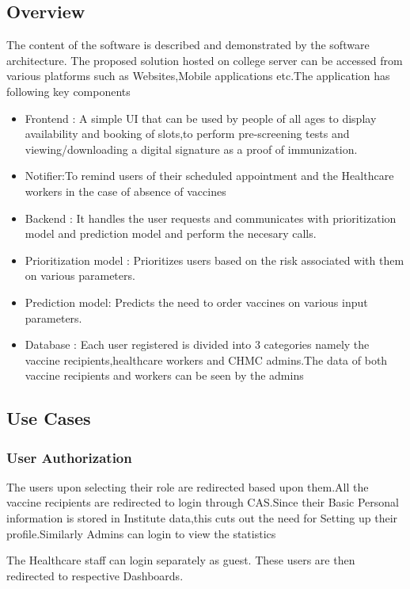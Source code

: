 \documentclass[10pt,twocolumn,letterpaper]{article}
\begin{document}
\subsection{Overview}
The content of the software is described and demonstrated by the software architecture.
The proposed solution hosted on college server can be accessed from various platforms such as Websites,Mobile applications etc.The application has following key components
\begin{itemize}
    \item Frontend : A simple UI that can be used by people of all ages to display availability and booking of slots,to perform pre-screening tests and viewing/downloading a digital signature as a proof of immunization.
    \item Notifier:To remind users of their scheduled appointment and the Healthcare workers in the case of absence of vaccines
    \item Backend : It handles the user requests and communicates with prioritization model and prediction model and perform the necesary calls.
    \item Prioritization model : Prioritizes users based on the risk associated with them on various parameters.
    \item Prediction model: Predicts the need to order vaccines on various input parameters.
    \item Database : Each user registered is divided into 3 categories namely the vaccine recipients,healthcare workers and CHMC admins.The data of both vaccine recipients and workers can be seen by the admins
\end{itemize}
\subsection{Use Cases}
\subsubsection{User Authorization}
The users upon selecting their role are redirected based upon them.All the vaccine recipients are redirected to login through CAS.Since their Basic Personal information is stored in Institute data,this cuts out the need for Setting up their profile.Similarly Admins can login to view the statistics

The Healthcare staff can login separately as guest.
These users are then redirected to respective Dashboards.
\end{document}
